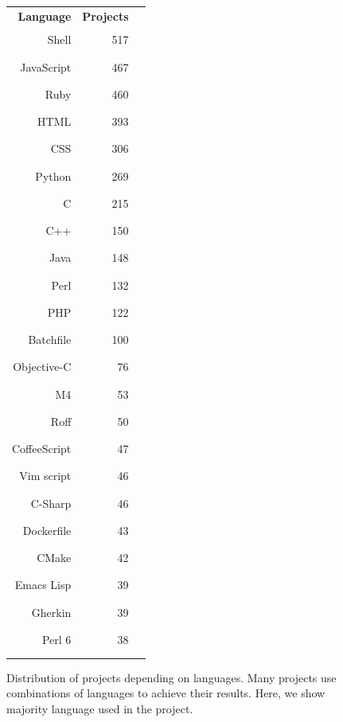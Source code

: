 \documentclass[sigconf,review]{acmart}
\begin{document}
\begin{figure}
{\small \renewcommand{\baselinestretch}{0.7}
\begin{tabular}{rrl}
    \textbf{Language} & \textbf{Projects} & \\
    Shell & 517 &\rule{86.17pt}{8pt} \\
    JavaScript & 467 &\rule{77.83pt}{8pt} \\
    Ruby & 460 &\rule{77.17pt}{8pt} \\
    HTML & 393 &\rule{76.67pt}{8pt} \\
    CSS & 306 &\rule{65.5pt}{8pt} \\
    Python & 269 &\rule{51pt}{8pt} \\
    C & 215 &\rule{35.83pt}{8pt} \\
    C++ & 150 &\rule{25pt}{8pt} \\
    Java & 148 &\rule{24.67pt}{8pt} \\
    Perl & 132 &\rule{22pt}{8pt} \\
    PHP & 122 &\rule{20.22pt}{8pt} \\
    Batchfile & 100 &\rule{16.67pt}{8pt} \\
    Objective-C & 76 &\rule{12.67pt}{8pt} \\
    M4 & 53 &\rule{8.83pt}{8pt} \\
    Roff & 50 &\rule{8.33pt}{8pt} \\
    CoffeeScript & 47 &\rule{7.83pt}{8pt} \\
    Vim script & 46 &\rule{7.67pt}{8pt} \\
    C-Sharp & 46 &\rule{7.67pt}{8pt} \\
    Dockerfile & 43 &\rule{7.17pt}{8pt} \\
    CMake & 42 &\rule{7pt}{8pt} \\
    Emacs Lisp & 39 &\rule{6.5pt}{8pt} \\
    Gherkin & 39 &\rule{6.5pt}{8pt} \\
    Perl 6 & 38 &\rule{6.33pt}{8pt} \\
     & 
\end{tabular}}
\caption{Distribution of projects depending on languages.
Many  projects use combinations of languages to
achieve their results. Here, we show majority language used in the project.}
\label{fig:lang_projects}
\end{figure}
\end{document}

